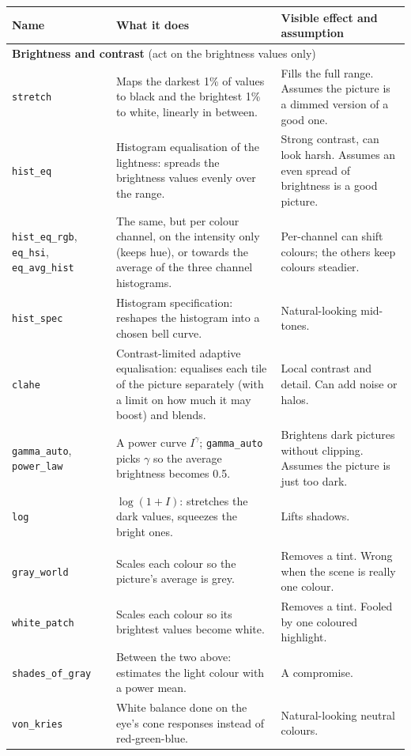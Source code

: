\documentclass[10pt,a4paper]{article}
\begin{document}
{\small\renewcommand{\arraystretch}{1.12}
\begin{longtable}{p{2.7cm}p{6.5cm}p{6.4cm}}
\toprule Name & What it does & Visible effect and assumption\\\midrule\endhead
\multicolumn{3}{l}{\textbf{Brightness and contrast} (act on the brightness values only)}\\
\texttt{stretch} & Maps the darkest 1\% of values to black and the brightest 1\% to white, linearly in between. & Fills the full range. Assumes the picture is a dimmed version of a good one.\\
\texttt{hist\_eq} & Histogram equalisation of the lightness: spreads the brightness values evenly over the range. & Strong contrast, can look harsh. Assumes an even spread of brightness is a good picture.\\
\texttt{hist\_eq\_rgb}, \texttt{eq\_hsi}, \texttt{eq\_avg\_hist} & The same, but per colour channel, on the intensity only (keeps hue), or towards the average of the three channel histograms. & Per-channel can shift colours; the others keep colours steadier.\\
\texttt{hist\_spec} & Histogram specification: reshapes the histogram into a chosen bell curve. & Natural-looking mid-tones.\\
\texttt{clahe} & Contrast-limited adaptive equalisation: equalises each tile of the picture separately (with a limit on how much it may boost) and blends. & Local contrast and detail. Can add noise or halos.\\
\texttt{gamma\_auto}, \texttt{power\_law} & A power curve $I^\gamma$; \texttt{gamma\_auto} picks $\gamma$ so the average brightness becomes 0.5. & Brightens dark pictures without clipping. Assumes the picture is just too dark.\\
\texttt{log} & $\log(1+I)$: stretches the dark values, squeezes the bright ones. & Lifts shadows.\\
\addlinespace\multicolumn{3}{l}{\textbf{Colour correction}}\\
\texttt{gray\_world} & Scales each colour so the picture's average is grey. & Removes a tint. Wrong when the scene is really one colour.\\
\texttt{white\_patch} & Scales each colour so its brightest values become white. & Removes a tint. Fooled by one coloured highlight.\\
\texttt{shades\_of\_gray} & Between the two above: estimates the light colour with a power mean. & A compromise.\\
\texttt{von\_kries} & White balance done on the eye's cone responses instead of red-green-blue. & Natural-looking neutral colours.\\

\end{longtable}}
\end{document}
